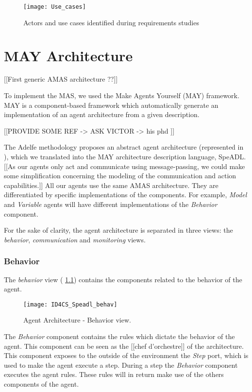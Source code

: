 \begin{figure}
\texttt{[image: Use\_cases]}
\caption{Actors and use cases identified during requirements studies}
\end{figure}


\chapter{MAY Architecture}

[[First generic AMAS architecture ??]]

To implement the MAS, we used the Make Agents Yourself (MAY) framework. MAY is a component-based framework which automatically generate an implementation of an agent architecture from a given description.

[[PROVIDE SOME REF -> ASK VICTOR -> his phd \cite{No2012.2}]]

The Adelfe methodology proposes an abstract agent architecture (represented in \fig{[[TODO]]}), which we translated into the MAY architecture description language, SpeADL. [[As our agents only act and communicate using message-passing, we could make some simplification concerning the modeling of the communication and action capabilities.]]
All our agents use the same AMAS architecture. They are differentiated by specific implementations of the components. For example, \emph{Model} and \emph{Variable} agents will have different implementations of the \emph{Behavior} component.

For the sake of clarity, the agent architecture is separated in three views: the \emph{behavior}, \emph{communication} and \emph{monitoring} views.

\subsection{Behavior}

The \emph{behavior} view (\figurename{} \ref{Arch-behavior}) contains the components related to the behavior of the agent. 

\begin{figure}
\centering
\texttt{[image: ID4CS\_Speadl\_behav]}
\caption{Agent Architecture - Behavior view.}
\label{Arch-behavior}
\end{figure}

The \emph{Behavior} component contains the rules which dictate the behavior of the agent. This component can be seen as the [[chef d'orchestre]] of the architecture. This component exposes to the outside of the environment the \emph{Step} port, which is used to make the agent execute a step. During a step the \emph{Behavior} component executes the agent rules. These rules will in return make use of the others components of the agent.

